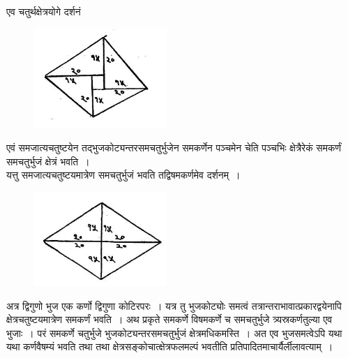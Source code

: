 \documentclass[11pt, openany]{book}
\begin{document}
\noindent एव चतुर्थक्षेत्रयोगे दर्शनं 
\begin{figure}[h!]
    \centering
    \includegraphics[scale=0.75]{graphics/Capture12.png}
\end{figure}
\newpage %

 एवं \;समजात्यचतुष्टयेन \;तद्भुजकोट्यन्तरसमचतुर्भुजेन \;समकर्णेन \;पञ्चमेन \;चेति पञ्चभिः क्षेत्रैरेकं समकर्णं समचतुर्भुजं क्षेत्रं भवति~। \\

\vspace{-4mm}
 यत्तु समजात्यचतुष्टयमात्रेण समचतुर्भुजं भवति तद्विषमकर्णमेव दर्शनम्~।
\vspace{-2mm}
 
\begin{figure}[h!]
    \centering
    \includegraphics[scale=.8]{graphics/Capture13.png}
\end{figure}
\vspace{-2mm}

 अत्र द्विगुणो भुज एक कर्णो द्विगुणा कोटिरपरः~। यत्र तु भुजकोट्योः 
समत्वं तत्रान्तराभावात्प्रकारद्वयेनापि क्षेत्रचतुष्टयमात्रेण समकर्णं
भवति~। अथ प्रकृते समकर्णे विषमकर्णे च समचतुर्भुजे त्र्यस्रकर्णतुल्या एव भुजाः~।
परं समकर्णे चतुर्भुजे भुजकोट्यन्तरसमचतुर्भुजं क्षेत्रमधिकमस्ति~। अत एव 
भुजसमत्वेऽपि यथा यथा कर्णवैषम्यं भवति तथा तथा क्षेत्रसङ्कोचात्क्षेत्रफलमल्पं भवतीति प्रतिपादितमाचार्यैर्लीलावत्याम्~। \\
\end{document}
